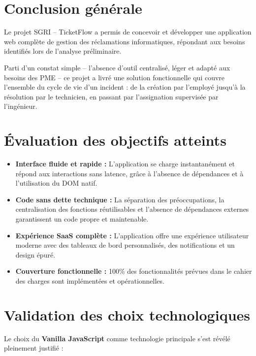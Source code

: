 \documentclass[12pt,a4paper,twoside]{report}
\begin{document}
\section{Conclusion générale}

Le projet SGRI -- TicketFlow a permis de concevoir et développer une application web complète de gestion des réclamations informatiques, répondant aux besoins identifiés lors de l'analyse préliminaire.

Parti d'un constat simple -- l'absence d'outil centralisé, léger et adapté aux besoins des PME -- ce projet a livré une solution fonctionnelle qui couvre l'ensemble du cycle de vie d'un incident : de la création par l'employé jusqu'à la résolution par le technicien, en passant par l'assignation supervisée par l'ingénieur.

\section{Évaluation des objectifs atteints}

\begin{itemize}
    \item \textbf{Interface fluide et rapide :} L'application se charge instantanément et répond aux interactions sans latence, grâce à l'absence de dépendances et à l'utilisation du DOM natif.
    \item \textbf{Code sans dette technique :} La séparation des préoccupations, la centralisation des fonctions réutilisables et l'absence de dépendances externes garantissent un code propre et maintenable.
    \item \textbf{Expérience SaaS complète :} L'application offre une expérience utilisateur moderne avec des tableaux de bord personnalisés, des notifications et un design épuré.
    \item \textbf{Couverture fonctionnelle :} 100\% des fonctionnalités prévues dans le cahier des charges sont implémentées et opérationnelles.
\end{itemize}

\section{Validation des choix technologiques}

Le choix du \textbf{Vanilla JavaScript} comme technologie principale s'est révélé pleinement justifié :
\end{document}
